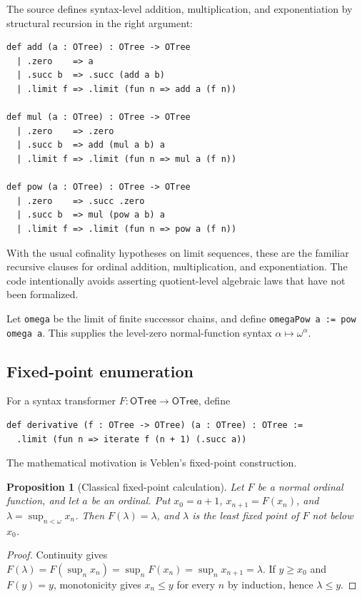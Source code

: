 \documentclass[11pt]{article}
\newtheorem{proposition}[theorem]{Proposition}
\theoremstyle{definition}
\theoremstyle{remark}
\newcommand{\OT}{\ensuremath{\mathsf{OTree}}}
\newcommand{\lean}[1]{\texttt{#1}}
\begin{document}
The source defines syntax-level addition, multiplication, and exponentiation by
structural recursion in the right argument:
\begin{lstlisting}
def add (a : OTree) : OTree -> OTree
  | .zero    => a
  | .succ b  => .succ (add a b)
  | .limit f => .limit (fun n => add a (f n))

def mul (a : OTree) : OTree -> OTree
  | .zero    => .zero
  | .succ b  => add (mul a b) a
  | .limit f => .limit (fun n => mul a (f n))

def pow (a : OTree) : OTree -> OTree
  | .zero    => .succ .zero
  | .succ b  => mul (pow a b) a
  | .limit f => .limit (fun n => pow a (f n))
\end{lstlisting}
With the usual cofinality hypotheses on limit sequences, these are the familiar
recursive clauses for ordinal addition, multiplication, and exponentiation.
The code intentionally avoids asserting quotient-level algebraic laws that have
not been formalized.

Let \lean{omega} be the limit of finite successor chains, and define
\lean{omegaPow a := pow omega a}.  This supplies the level-zero normal-function
syntax $\alpha\mapsto\omega^\alpha$.

\subsection{Fixed-point enumeration}

For a syntax transformer $F:\OT\to\OT$, define
\begin{lstlisting}
def derivative (f : OTree -> OTree) (a : OTree) : OTree :=
  .limit (fun n => iterate f (n + 1) (.succ a))
\end{lstlisting}

The mathematical motivation is Veblen's fixed-point construction.

\begin{proposition}[Classical fixed-point calculation]
Let $F$ be a normal ordinal function, and let $a$ be an ordinal.  Put
$x_0=a+1$, $x_{n+1}=F(x_n)$, and $\lambda=\sup_{n<\omega}x_n$.  Then
$F(\lambda)=\lambda$, and $\lambda$ is the least fixed point of $F$ not below
$x_0$.
\end{proposition}

\begin{proof}
Continuity gives
$F(\lambda)=F(\sup_n x_n)=\sup_n F(x_n)=\sup_n x_{n+1}=\lambda$.
If $y\ge x_0$ and $F(y)=y$, monotonicity gives $x_n\le y$ for every $n$ by
induction, hence $\lambda\le y$.
\end{proof}
\end{document}
